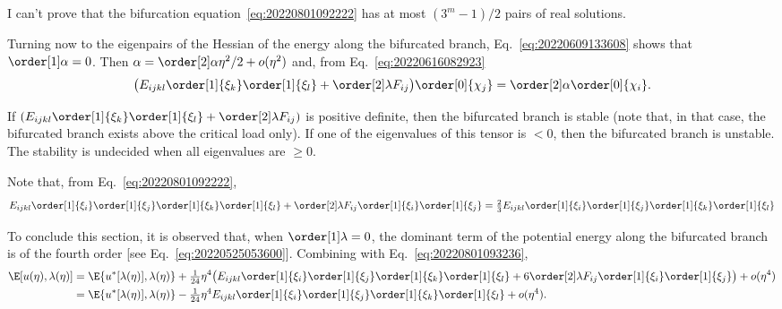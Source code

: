 \begin{remark}
  I can't prove that the bifurcation equation~\eqref{eq:20220801092222} has at most $(3^m - 1) / 2$ pairs of real
  solutions.
\end{remark}

Turning now to the eigenpairs of the Hessian of the energy along the bifurcated branch, Eq.~\eqref{eq:20220609133608}
shows that $\order[1]\alpha = 0$. Then $\alpha = \order[2]\alpha \eta^2 / 2 + o(\eta^2)$ and, from
Eq.~\eqref{eq:20220616082923}
\begin{equation}
  \bigl(E_{ijkl} \order[1]{\xi_k} \order[1]{\xi_l} + \order[2]\lambda F_{ij} \bigr) \order[0]{\chi_j} = \order[2]\alpha \order[0]{\chi_i}.
\end{equation}

If $(E_{ijkl} \order[1]{\xi_k} \order[1]{\xi_l} + \order[2]\lambda F_{ij} )$ is positive definite, then the bifurcated
branch is stable (note that, in that case, the bifurcated branch exists above the critical load only). If one of the
eigenvalues of this tensor is $<0$, then the bifurcated branch is unstable. The stability is undecided when all
eigenvalues are $\geq 0$.

\begin{remark}
  Note that, from Eq.~\eqref{eq:20220801092222},
  \begin{equation}
    E_{ijkl} \order[1]{\xi_i} \order[1]{\xi_j} \order[1]{\xi_k} \order[1]{\xi_l} + \order[2]\lambda F_{ij} \order[1]{\xi_i} \order[1]{\xi_j} = \tfrac{2}{3} E_{ijkl} \order[1]{\xi_i} \order[1]{\xi_j} \order[1]{\xi_k} \order[1]{\xi_l}
  \end{equation}

\end{remark}

To conclude this section, it is observed that, when $\order[1]\lambda = 0$, the dominant term of the potential energy
along the bifurcated branch is of the fourth order [see Eq.~\eqref{eq:20220525053600}]. Combining with
Eq.~\eqref{eq:20220801093236},
\begin{equation}
  \label{eq:20220801094437}
  \begin{aligned}[b]
    \E[u(\eta), \lambda(\eta)]
    &= \E\{u^{\ast}[\lambda(\eta)], \lambda(\eta)\} + \tfrac{1}{24} \eta^4 \bigl(E_{ijkl} \order[1]{\xi_i} \order[1]{\xi_j} \order[1]{\xi_k} \order[1]{\xi_l}  + 6  \order[2]\lambda F_{ij} \order[1]{\xi_i} \order[1]{\xi_j}\bigr) + o(\eta^4)\\
    &= \E\{u^{\ast}[\lambda(\eta)], \lambda(\eta)\} - \tfrac{1}{24} \eta^4 E_{ijkl} \order[1]{\xi_i} \order[1]{\xi_j} \order[1]{\xi_k} \order[1]{\xi_l} + o(\eta^4).
  \end{aligned}
\end{equation}

